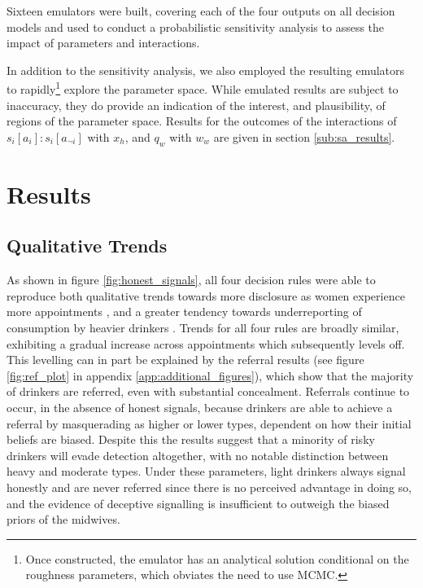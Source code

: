 \documentclass[graybox]{svmult}
\begin{document}
Sixteen emulators were built, covering each of the four outputs on all decision models and used to conduct a probabilistic sensitivity analysis to assess the impact of parameters and interactions.

In addition to the sensitivity analysis, we also employed the resulting emulators to rapidly\footnote{Once constructed, the emulator has an analytical solution conditional on the roughness parameters, which obviates the need to use MCMC.} explore the parameter space. While emulated results are subject to inaccuracy, they do provide an indication of the interest, and plausibility, of regions of the parameter space. Results for the outcomes of the interactions of \(s_{i}[a_{i}]:s_{i}[a_{\neg i}]\) with \(x_{h}\), and \(q_{w}\) with \(w_{w}\) are given in section \ref{sub:sa_results}. 
\section{Results}
\label{sec:results}


\subsection{Qualitative Trends}
\label{sub:qt_results}

As shown in figure \ref{fig:honest_signals}, all four decision rules were able to reproduce both qualitative trends towards more disclosure as women experience more appointments \citep{Phillips2007}, and a greater tendency towards underreporting of consumption by heavier drinkers \citep{Alvik2006}.  
Trends for all four rules are broadly similar, exhibiting a gradual increase across appointments which subsequently levels off. This levelling can in part be explained by the referral results (see figure \ref{fig:ref_plot} in appendix \ref{app:additional_figures}), which show that the majority of drinkers are referred, even with substantial concealment. Referrals continue to occur, in the absence of honest signals, because drinkers are able to achieve a referral by masquerading as higher or lower types, dependent on how their initial beliefs are biased. Despite this the results suggest that a minority of risky drinkers will evade detection altogether, with no notable distinction between heavy and moderate types. Under these parameters, light drinkers always signal honestly and are never referred since there is no perceived advantage in doing so, and the evidence of deceptive signalling is insufficient to outweigh the biased priors of the midwives. 
\end{document}
